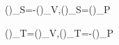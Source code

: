 \left(\right)_S=-\left(\right)_V,\qquad\left(\right)_S=\left(\right)_P

\left(\right)_T=\left(\right)_V,\qquad\left(\right)_T=-\left(\right)_P

